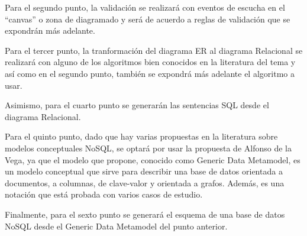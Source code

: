 Para el segundo punto, la validación se realizará con eventos de escucha en el ``canvas'' o zona de diagramado y será de acuerdo a reglas de validación que se expondrán más adelante.


Para el tercer punto, la tranformación del diagrama ER al diagrama Relacional se realizará con alguno de los algoritmos bien conocidos en la literatura del tema y así como en el segundo punto, también se expondrá más adelante el algoritmo a usar.


Asimismo, para el cuarto punto se generarán las sentencias SQL desde el diagrama Relacional.


Para el quinto punto, dado que hay varias propuestas en la literatura sobre modelos conceptuales NoSQL, se optará por usar la propuesta de Alfonso de la Vega\cite{de_la_vega_mortadelo_2020}, ya que el modelo que propone, conocido como Generic Data Metamodel, es un modelo conceptual que sirve para describir una base de datos orientada a documentos, a columnas, de clave-valor y orientada a grafos. Además, es una notación que está probada con varios casos de estudio.


Finalmente, para el sexto punto se generará el esquema de una base de datos NoSQL desde el Generic Data Metamodel del punto anterior.